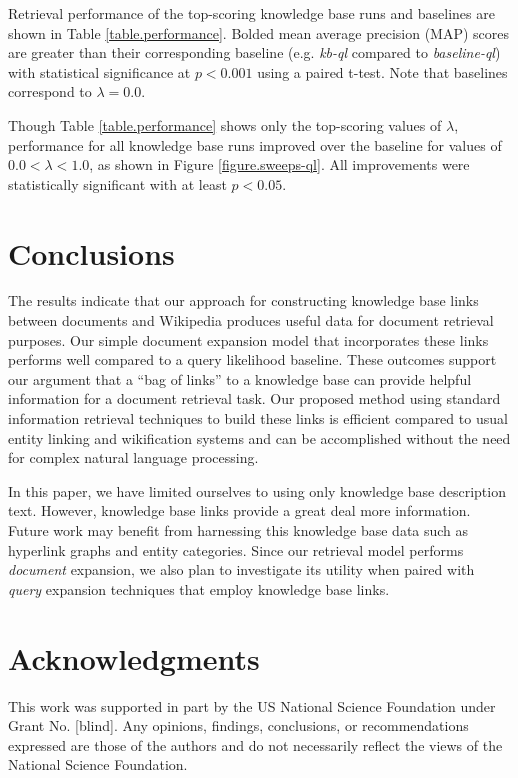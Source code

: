 \documentclass{sig-alternate}
\begin{document}
Retrieval performance of the top-scoring knowledge base runs and baselines are shown in Table \ref{table.performance}. Bolded mean average precision (MAP) scores are greater than their corresponding baseline (e.g. \textit{kb-ql} compared to \textit{baseline-ql}) with statistical significance at $p < 0.001$ using a paired t-test. Note that baselines correspond to $\lambda = 0.0$. 

Though Table \ref{table.performance} shows only the top-scoring values of $\lambda$, performance for all knowledge base runs improved over the baseline for values of $0.0 < \lambda < 1.0$, as shown in Figure \ref{figure.sweeps-ql}. All improvements were statistically significant with at least $p < 0.05$.


\section{Conclusions}\label{section.conclusions}

The results indicate that our approach for constructing knowledge base links between documents and Wikipedia produces useful data for document retrieval purposes. Our simple document expansion model that incorporates these links performs well compared to a query likelihood baseline. These outcomes support our argument that a ``bag of links'' to a knowledge base can provide helpful information for a document retrieval task. Our proposed method using standard information retrieval techniques to build these links is efficient compared to usual entity linking and wikification systems and can be accomplished without the need for complex natural language processing.

In this paper, we have limited ourselves to using only knowledge base description text. However, knowledge base links provide a great deal more information. Future work may benefit from harnessing this knowledge base data such as hyperlink graphs and entity categories. Since our retrieval model performs \textit{document} expansion, we also plan to investigate its utility when paired with \textit{query} expansion techniques that employ knowledge base links.

\section{Acknowledgments}\label{section.acknowledgments}
This work was supported in part by the US National Science Foundation under Grant No. [blind]. Any opinions, findings, conclusions, or recommendations expressed are those of the authors and do not necessarily reflect the views of the National Science Foundation.



  
\end{document}
